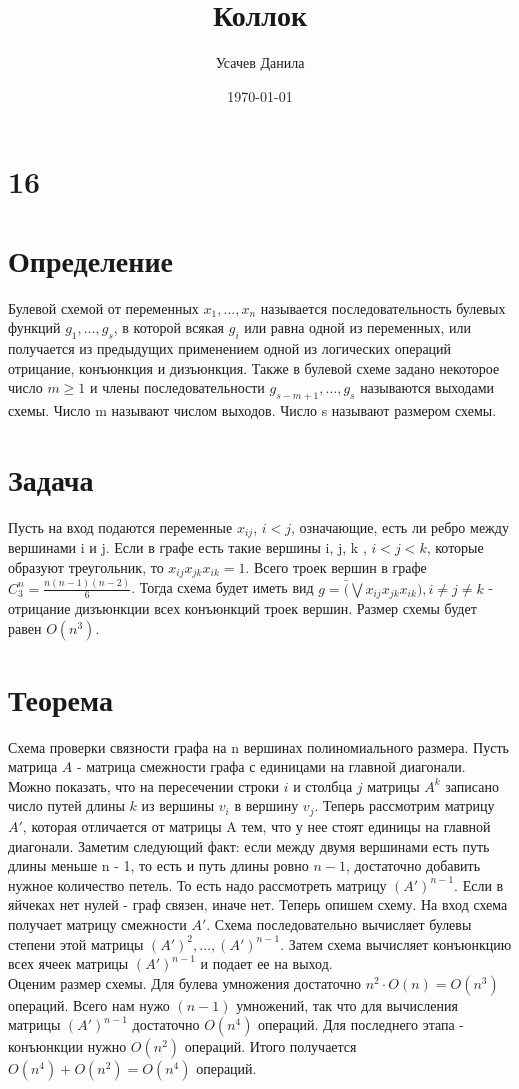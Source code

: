 \documentclass[12pt,a4paper]{scrartcl}
\title{Коллок}
\author{Усачев Данила}
\date{\today}
\begin{document}
\maketitle
\noindent
\section*{16}
\section*{Определение}
Булевой схемой от переменных $x_1, \ldots, x_n$ называется последовательность булевых
функций $g_1, \ldots, g_s$, в которой всякая $g_i$ или равна одной из переменных,
или получается из предыдущих применением одной из логических операций отрицание,
конъюнкция и дизъюнкция. Также в булевой схеме задано некоторое число $m \geq 1$
и члены последовательности $g_{s-m+1}, \ldots, g_s$ называются выходами схемы.
Число m называют числом выходов. Число s называют размером схемы.
\section*{Задача}
Пусть на вход подаются переменные $x_{ij}$, $i < j$, означающие, есть ли ребро
между вершинами i и j. Если в графе есть такие вершины i, j, k , $i < j < k$,
которые образуют треугольник, то $x_{ij}x_{jk}x_{ik}=1$. Всего троек вершин
в графе  $C^{n}_{3} = \frac{n(n-1)(n-2)}{6}$.  Тогда схема будет иметь вид
$g = \bar (\bigvee x_{ij}x_{jk}x_{ik}), i \neq j \neq k$ - отрицание дизъюнкции
всех конъюнкций троек вершин. Размер схемы будет равен $O(n^{3})$.\\
\section*{Теорема}
Схема проверки связности графа на n вершинах полиномиального размера.
Пусть матрица $A$ - матрица смежности графа с единицами на главной диагонали.
Можно показать, что на пересечении строки $i$ и столбца $j$ матрицы $A^{k}$
записано число путей длины $k$ из вершины $v_i$ в вершину $v_j$.
Теперь рассмотрим матрицу $A'$, которая отличается от матрицы A тем, что
у нее стоят единицы на главной диагонали.
Заметим следующий факт: если между двумя вершинами есть путь длины меньше n - 1,
то есть и путь длины
ровно $n-1$, достаточно добавить нужное количество петель. То есть надо рассмотреть
матрицу $(A')^{n-1}$. Если в яйчеках нет нулей - граф связен, иначе нет. Теперь
опишем схему.
На вход схема получает матрицу смежности $A'$. Схема последовательно
вычисляет булевы степени этой матрицы $(A')^2,\ldots,(A')^{n-1}$. Затем
схема вычисляет конъюнкцию всех ячеек матрицы $(A')^{n-1}$ и подает ее на выход.\\
Оценим размер схемы. Для булева умножения достаточно $n^2\cdot O(n) = O(n^3)$
операций. Всего нам нужо $(n-1)$ умножений, так что для вычисления матрицы $(A')^{n-1}$
достаточно $O(n^4)$ операций. Для последнего этапа - конъюнкции нужно $O(n^2)$
операций. Итого получается $O(n^4)+O(n^2) = O(n^4)$ операций.
\end{document}
